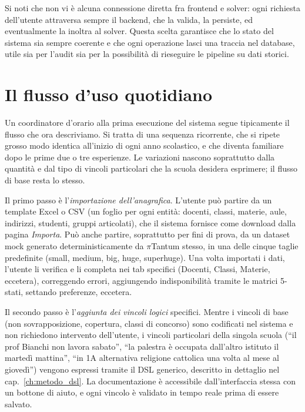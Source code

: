 Si noti che non vi \`e alcuna connessione diretta fra
frontend e solver: ogni richiesta dell'utente attraversa
sempre il backend, che la valida, la persiste, ed
eventualmente la inoltra al solver. Questa scelta garantisce
che lo stato del sistema sia sempre coerente e che ogni
operazione lasci una traccia nel database, utile sia per
l'audit sia per la possibilit\`a di rieseguire le pipeline su
dati storici.

\section{Il flusso d'uso quotidiano}

Un coordinatore d'orario alla prima esecuzione del sistema
segue tipicamente il flusso che ora descriviamo. Si tratta
di una sequenza ricorrente, che si ripete grosso modo
identica all'inizio di ogni anno scolastico, e che diventa
familiare dopo le prime due o tre esperienze. Le variazioni
nascono soprattutto dalla quantit\`a e dal tipo di vincoli
particolari che la scuola desidera esprimere; il flusso di
base resta lo stesso.

Il primo passo \`e l'\emph{importazione dell'anagrafica}.
L'utente pu\`o partire da un template Excel o CSV (un foglio
per ogni entit\`a: docenti, classi, materie, aule, indirizzi,
studenti, gruppi articolati), che il sistema fornisce come
download dalla pagina \emph{Importa}. Pu\`o anche partire,
soprattutto per fini di prova, da un dataset mock generato
deterministicamente da $\pi$Tantum stesso, in una delle
cinque taglie predefinite (small, medium, big, huge,
superhuge). Una volta importati i dati, l'utente li
verifica e li completa nei tab specifici (Docenti, Classi,
Materie, eccetera), correggendo errori, aggiungendo
indisponibilit\`a tramite le matrici 5-stati, settando
preferenze, eccetera.

Il secondo passo \`e l'\emph{aggiunta dei vincoli logici}
specifici. Mentre i vincoli di base (non sovrapposizione,
copertura, classi di concorso) sono codificati nel sistema e
non richiedono intervento dell'utente, i vincoli particolari
della singola scuola (``il prof Bianchi non lavora sabato'',
``la palestra \`e occupata dall'altro istituto il marted\`i
mattina'', ``in 1A alternativa religione cattolica una volta
al mese al gioved\`i'') vengono espressi tramite il DSL generico,
descritto in dettaglio nel cap.~\ref{ch:metodo_dsl}. La
documentazione \`e accessibile dall'interfaccia stessa con un
bottone di aiuto, e ogni vincolo \`e validato in tempo reale
prima di essere salvato.

